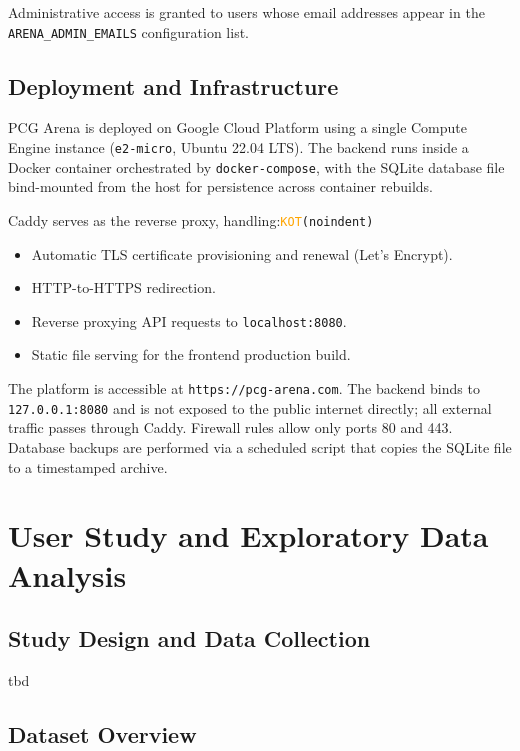\documentclass[shortabstract, mgr, english]{iithesis}
\newcommand{\DEBUG}[1]{{#1}} %
\newcommand{\KOT}[1]{\DEBUG{\tt{\textcolor{orange}{KOT}(}{#1}{)}}}
\begin{document}
Administrative access is granted to users whose email addresses appear in the
\texttt{ARENA\_ADMIN\_EMAILS} configuration list.

\section{Deployment and Infrastructure}
\label{sec:sd-deployment}

PCG Arena is deployed on Google Cloud Platform using a single Compute Engine instance
(\texttt{e2-micro}, Ubuntu 22.04 LTS). The backend runs inside a Docker container
orchestrated by \texttt{docker-compose}, with the SQLite database file bind-mounted
from the host for persistence across container rebuilds.

Caddy serves as the reverse proxy, handling:\KOT{noindent}

\begin{itemize}[nosep]
    \item Automatic TLS certificate provisioning and renewal (Let's Encrypt).
    \item HTTP-to-HTTPS redirection.
    \item Reverse proxying API requests to \texttt{localhost:8080}.
    \item Static file serving for the frontend production build.
\end{itemize}

The platform is accessible at \texttt{https://pcg-arena.com}. The backend binds to
\texttt{127.0.0.1:8080} and is not exposed to the public internet directly; all external
traffic passes through Caddy. Firewall rules allow only ports 80 and 443. Database backups
are performed via a scheduled script that copies the SQLite file to a timestamped archive.



\chapter{User Study and Exploratory Data Analysis}
\label{ch:eda}


\section{Study Design and Data Collection}
\label{sec:eda-study-design}

tbd

\section{Dataset Overview}
\label{sec:eda-dataset}
\end{document}

